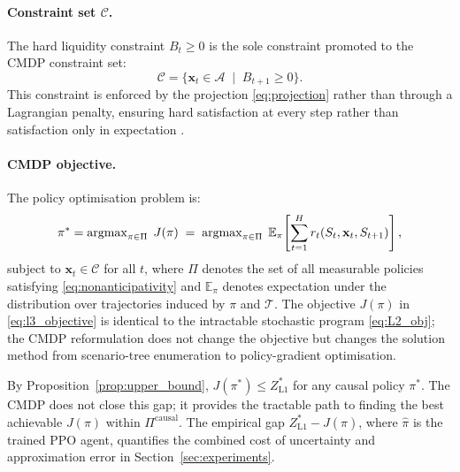 \paragraph{Constraint set $\mathcal{C}$.}
The hard liquidity constraint $B_t \geq 0$ is the sole constraint
promoted to the CMDP constraint set:
\begin{equation}
  \mathcal{C} = \bigl\{
    \mathbf{x}_t \in \mathcal{A} \;\mid\; B_{t+1} \geq 0
  \bigr\}.
  \label{eq:l3_constraint}
\end{equation}
This constraint is enforced by the projection \eqref{eq:projection}
rather than through a Lagrangian penalty, ensuring hard satisfaction
at every step rather than satisfaction only in expectation
\citep{altman1999constrained}.

\paragraph{CMDP objective.}
The policy optimisation problem is:
\begin{equation}
  \pi^* = \operatorname{argmax}_{\pi \in \Pi}
    \;J(\pi) \;=\;
    \operatorname{argmax}_{\pi \in \Pi}
    \;\mathbb{E}_{\pi}\!\left[
      \sum_{t=1}^{H} r_t(S_t, \mathbf{x}_t, S_{t+1})
    \right],
  \label{eq:l3_objective}
\end{equation}
subject to $\mathbf{x}_t \in \mathcal{C}$ for all $t$, where
$\Pi$ denotes the set of all measurable policies satisfying
\eqref{eq:nonanticipativity} and $\mathbb{E}_\pi$ denotes expectation
under the distribution over trajectories induced by $\pi$ and
$\mathcal{T}$. The objective $J(\pi)$ in \eqref{eq:l3_objective} is
identical to the intractable stochastic program \eqref{eq:L2_obj};
the CMDP reformulation does not change the objective but changes the
solution method from scenario-tree enumeration to policy-gradient
optimisation.

\begin{remark}
By Proposition~\ref{prop:upper_bound}, $J(\pi^*) \leq Z^*_{\mathrm{L1}}$
for any causal policy $\pi^*$. The CMDP does not close this gap; it
provides the tractable path to finding the best achievable $J(\pi)$
within $\Pi^{\mathrm{causal}}$. The empirical gap
$Z^*_{\mathrm{L1}} - J(\hat{\pi})$, where $\hat{\pi}$ is the trained
PPO agent, quantifies the combined cost of uncertainty and
approximation error in Section~\ref{sec:experiments}.
\end{remark}

